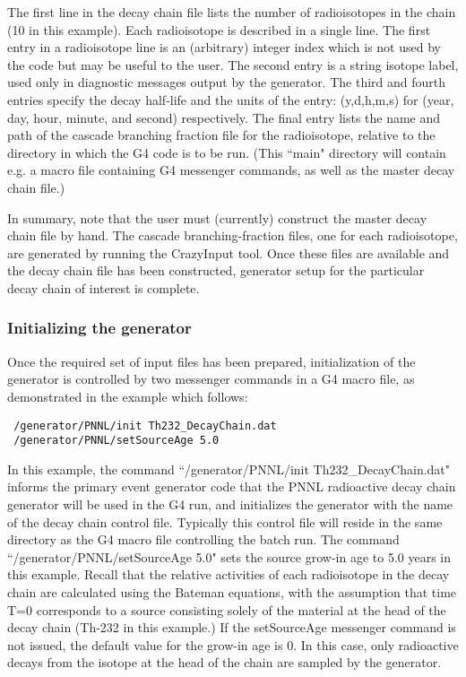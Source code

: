  The first line in the decay chain file lists the number of radioisotopes in the
chain (10 in this example).  Each radioisotope is described in a single line.
The first entry in a radioisotope line is an (arbitrary) integer index which 
is not used by the code but may be useful to the user.  The second entry is
a string isotope label, used only in diagnostic messages output by the 
generator.  The third and fourth entries specify the decay half-{}life and the
units of the entry: (y,d,h,m,s) for (year, day, hour, minute, and second)
respectively.  The final entry lists the name and path of the cascade branching
fraction file for the radioisotope, relative to the directory in which the
G4 code is to be run.  (This ``main" directory will contain e.g. a macro file
containing G4 messenger commands, as well as the master decay chain file.)
 

 In summary, note that the user must (currently) construct the master decay 
chain file by hand.  The cascade branching-{}fraction files, one for each 
radioisotope, are generated by running the CrazyInput tool.  Once these files
are available and the decay chain file has been constructed, generator setup 
for the particular decay chain of interest is complete.
 

\subsubsection{Initializing the generator}

 Once the required set of input files has been prepared, initialization of the 
generator is controlled by two messenger commands in a G4 macro file, as
demonstrated in the example which follows:
 

\begin{lstlisting}
 /generator/PNNL/init Th232_DecayChain.dat
 /generator/PNNL/setSourceAge 5.0
\end{lstlisting}

 In this example, the command ``/generator/PNNL/init Th232\_DecayChain.dat"
informs the primary event generator code that the PNNL radioactive decay
chain generator will be used in the G4 run, and initializes the generator with
the name of the decay chain control file.  Typically this control file will
reside in the same directory as the G4 macro file controlling the batch run.
The command ``/generator/PNNL/setSourceAge 5.0" sets the source grow-{}in age
to 5.0 years in this example.  Recall that the relative activities of each
radioisotope in the decay chain are calculated using the Bateman equations,
with the assumption that time T=0 corresponds to a source consisting solely
of the material at the head of the decay chain (Th-{}232 in this example.)  If
the setSourceAge messenger command is not issued, the default value for the
grow-in age is 0.  In this case, only radioactive decays from the isotope at 
the head of the chain are sampled by the generator.
 

